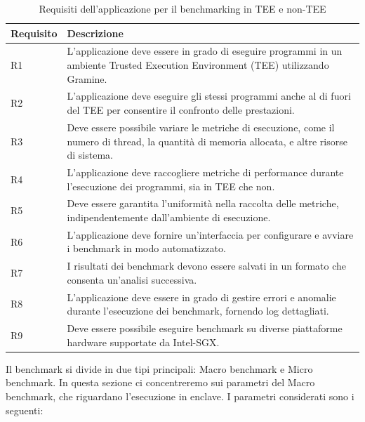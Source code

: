 \documentclass{article}
\begin{document}
\begin{table}[h]
\centering
\begin{tabular}{|l|p{10cm}|}
\hline
\textbf{Requisito} & \textbf{Descrizione} \\ \hline
R1 & L'applicazione deve essere in grado di eseguire programmi in un ambiente Trusted Execution Environment (TEE) utilizzando Gramine. \\ \hline
R2 & L'applicazione deve eseguire gli stessi programmi anche al di fuori del TEE per consentire il confronto delle prestazioni. \\ \hline
R3 & Deve essere possibile variare le metriche di esecuzione, come il numero di thread, la quantità di memoria allocata, e altre risorse di sistema. \\ \hline
R4 & L'applicazione deve raccogliere metriche di performance durante l'esecuzione dei programmi, sia in TEE che non. \\ \hline
R5 & Deve essere garantita l'uniformità nella raccolta delle metriche, indipendentemente dall'ambiente di esecuzione. \\ \hline
R6 & L'applicazione deve fornire un'interfaccia per configurare e avviare i benchmark in modo automatizzato. \\ \hline
R7 & I risultati dei benchmark devono essere salvati in un formato che consenta un'analisi successiva. \\ \hline
R8 & L'applicazione deve essere in grado di gestire errori e anomalie durante l'esecuzione dei benchmark, fornendo log dettagliati. \\ \hline
R9 & Deve essere possibile eseguire benchmark su diverse piattaforme hardware supportate da Intel-SGX. \\ \hline
\end{tabular}
\caption{Requisiti dell'applicazione per il benchmarking in TEE e non-TEE}
\end{table}

Il benchmark si divide in due tipi principali: Macro benchmark e Micro benchmark. In questa sezione ci concentreremo sui parametri del Macro benchmark, che riguardano l'esecuzione in enclave. I parametri considerati sono i seguenti:
\end{document}
